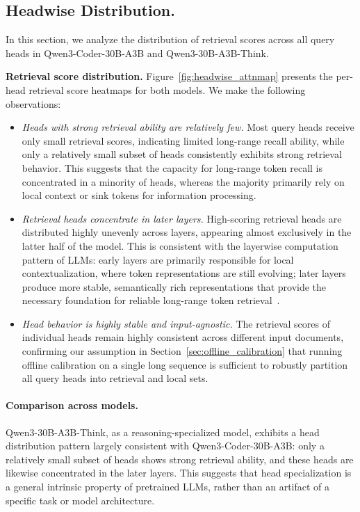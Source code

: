 \documentclass{llmxive}
\begin{document}
\subsection{Headwise Distribution.}
\label{appd:distribution}

In this section, we analyze the distribution of retrieval scores across all query heads in Qwen3-Coder-30B-A3B and Qwen3-30B-A3B-Think.

\noindent\textbf{Retrieval score distribution.}
Figure~\ref{fig:headwise_attnmap} presents the per-head retrieval score heatmaps for both models. We make the following observations:

\begin{itemize}[leftmargin=*, itemindent=0pt]
    \item \emph{Heads with strong retrieval ability are relatively few.} Most query heads receive only small retrieval scores, indicating limited long-range recall ability, while only a relatively small subset of heads consistently exhibits strong retrieval behavior. This suggests that the capacity for long-range token recall is concentrated in a minority of heads, whereas the majority primarily rely on local context or sink tokens for information processing.

    \item \emph{Retrieval heads concentrate in later layers.} High-scoring retrieval heads are distributed highly unevenly across layers, appearing almost exclusively in the latter half of the model. This is consistent with the layerwise computation pattern of LLMs: early layers are primarily responsible for local contextualization, where token representations are still evolving; later layers produce more stable, semantically rich representations that provide the necessary foundation for reliable long-range token retrieval~\citep{ghandeharioun2024patchscopes}.

    \item \emph{Head behavior is highly stable and input-agnostic.} The retrieval scores of individual heads remain highly consistent across different input documents, confirming our assumption in Section~\ref{sec:offline_calibration} that running offline calibration on a single long sequence is sufficient to robustly partition all query heads into retrieval and local sets.
\end{itemize}

\paragraph{Comparison across models.}
Qwen3-30B-A3B-Think, as a reasoning-specialized model, exhibits a head distribution pattern largely consistent with Qwen3-Coder-30B-A3B: only a relatively small subset of heads shows strong retrieval ability, and these heads are likewise concentrated in the later layers. This suggests that head specialization is a general intrinsic property of pretrained LLMs, rather than an artifact of a specific task or model architecture.
\end{document}
